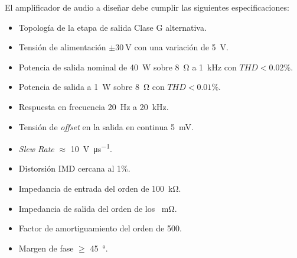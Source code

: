 El amplificador de audio a diseñar debe cumplir las siguientes especificaciones:

\begin{itemize}
	\item Topología de la etapa de salida Clase G alternativa.
	\item Tensión de alimentación $\pm \SI{30}{\volt}$ con una variación de \SI{5}{\volt}.
	\item Potencia de salida nominal de \SI{40}{\watt} sobre \SI{8}{\ohm} a \SI{1}{\kilo\hertz} con $THD<\num{0.02}\%$.
	\item Potencia de salida a \SI{1}{\watt} sobre \SI{8}{\ohm} con $THD<\num{0.01}\%$. 
	\item Respuesta en frecuencia \SI{20}{\hertz} a \SI{20}{\kilo\hertz}.
	\item Tensión de \textit{offset} en la salida en continua \SI{5}{\milli\volt}.
	\item \textit{Slew Rate} $\approx$ \SI{10}{\volt\per\micro\second}.
	\item Distorsión IMD cercana al 1\%.
	\item Impedancia de entrada del orden de \SI{100}{\kilo\ohm}.
	\item Impedancia de salida del orden de los \SI{}{\milli\ohm}.
	\item Factor de amortiguamiento del orden de 500.
	\item Margen de fase $\geq$ \SI{45}{\degree}.
\end{itemize}


